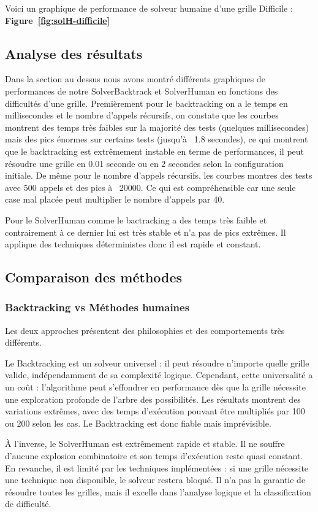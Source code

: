 \documentclass[a4paper]{article}
\begin{document}
Voici un graphique de performance de solveur humaine d'une grille Difficile : \textbf{Figure~\ref{fig:solH-difficile}}

\subsection{Analyse des résultats}
Dans la section au dessus nous avons montré différents graphiques de performances de notre SolverBacktrack et SolverHuman en fonctions des difficultés d’une grille. Premièrement pour le backtracking on a le temps en millisecondes et le nombre d’appels récursifs, on constate que les courbes montrent des temps très faibles sur la majorité des tests (quelques millisecondes) mais des pics énormes sur certains tests (jusqu’à ~1.8 secondes), ce qui montrent que le backtracking est extrêmement instable en terme de performances, il peut résoudre une grille en 0.01 seconde ou en 2 secondes selon la configuration initiale. 
De même pour le nombre d’appels récursifs, les courbes montres des tests avec 500 appels et des pics à ~20000. Ce qui est compréhensible car une seule case mal placée peut multiplier le nombre d’appels par 40.

Pour le SolverHuman comme le bactracking a des temps très faible et contrairement à ce dernier lui est très stable et n’a pas de pics extrêmes. Il applique des techniques déterministes donc il est rapide et constant.

\subsection{Comparaison des méthodes}

\subsubsection{Backtracking vs Méthodes humaines}
Les deux approches présentent des philosophies et des comportements très différents.

Le Backtracking est un solveur universel : il peut résoudre n’importe quelle grille valide, indépendamment de sa complexité logique. Cependant, cette universalité a un coût : l’algorithme peut s’effondrer en performance dès que la grille nécessite une exploration profonde de l’arbre des possibilités. Les résultats montrent des variations extrêmes, avec des temps d’exécution pouvant être multipliés par 100 ou 200 selon les cas. Le Backtracking est donc fiable mais imprévisible.

À l’inverse, le SolverHuman est extrêmement rapide et stable. Il ne souffre d’aucune explosion combinatoire et son temps d’exécution reste quasi constant. En revanche, il est limité par les techniques implémentées : si une grille nécessite une technique non disponible, le solveur restera bloqué. Il n’a pas la garantie de résoudre toutes les grilles, mais il excelle dans l’analyse logique et la classification de difficulté.
\end{document}
